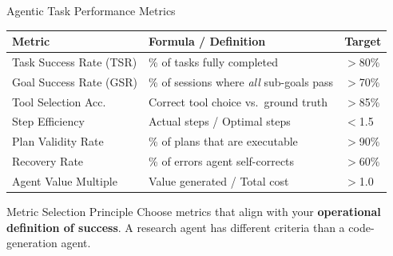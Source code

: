 \documentclass{beamer}       %
\begin{document}
\begin{frame}{Agentic Task Performance Metrics}
    \footnotesize
    \begin{table}
        \centering
        \begin{tabular}{@{}p{2.5cm}p{4.5cm}p{1.5cm}@{}}
            \toprule
            \textbf{Metric} & \textbf{Formula / Definition} & \textbf{Target} \\
            \midrule
            Task Success Rate (TSR) & \% of tasks fully completed & $>$80\% \\[2pt]
            Goal Success Rate (GSR) & \% of sessions where \textit{all} sub-goals pass & $>$70\% \\[2pt]
            Tool Selection Acc. & Correct tool choice vs.\ ground truth & $>$85\% \\[2pt]
            Step Efficiency & Actual steps / Optimal steps & $<$1.5 \\[2pt]
            Plan Validity Rate & \% of plans that are executable & $>$90\% \\[2pt]
            Recovery Rate & \% of errors agent self-corrects & $>$60\% \\[2pt]
            Agent Value Multiple & Value generated / Total cost & $>$1.0 \\
            \bottomrule
        \end{tabular}
    \end{table}
    \vfill
    \begin{block}{Metric Selection Principle}
        \small Choose metrics that align with your \textbf{operational definition of success}. A research agent has different criteria than a code-generation agent.
    \end{block}
\end{frame}
\end{document}
